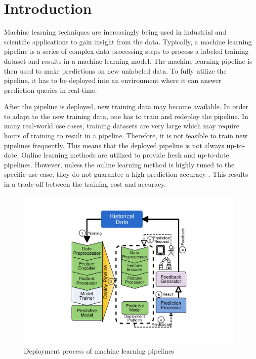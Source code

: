 \section{Introduction} \label{introduction}
Machine learning techniques are increasingly being used in industrial and scientific applications to gain insight from the data.
Typically, a machine learning pipeline is a series of complex data processing steps to process a labeled training dataset and results in a machine learning model.
The machine learning pipeline is then used to make predictions on new unlabeled data.
To fully utilize the pipeline, it has to be deployed into an environment where it can answer prediction queries in real-time.

After the pipeline is deployed, new training data may become available.
In order to adapt to the new training data, one has to train and redeploy the pipeline.
In many real-world use cases, training datasets are very large which may require hours of training to result in a pipeline.
Therefore, it is not feasible to train new pipelines frequently.
This means that the deployed pipeline is not always up-to-date.
Online learning methods are utilized to provide fresh and up-to-date pipelines.
However, unless the online learning method is highly tuned to the specific use case, they do not guarantee a high prediction accuracy \cite{ma2009identifying, macmahan2013}. 
This results in a trade-off between the training cost and accuracy.

\begin{figure}[h!]
\centering
\includegraphics[width=\columnwidth]{../images/generic-motivational-example.pdf}
\caption{Deployment process of machine learning pipelines}
\label{fig:motivational-example}
\end{figure}

